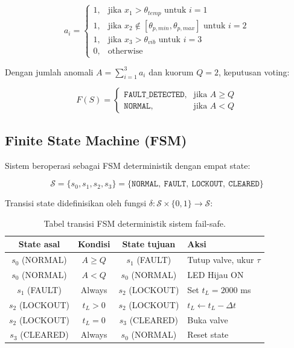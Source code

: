 \documentclass[12pt,a4paper]{article}
\begin{document}
\begin{equation}
  a_i = \begin{cases}
    1, & \text{jika } x_1 > \theta_{temp} \text{ untuk } i = 1 \\
    1, & \text{jika } x_2 \notin [\theta_{p,min}, \theta_{p,max}] \text{ untuk } i = 2 \\
    1, & \text{jika } x_3 > \theta_{vib} \text{ untuk } i = 3 \\
    0, & \text{otherwise}
  \end{cases}
\end{equation}

Dengan jumlah anomali $A = \sum_{i=1}^{3} a_i$ dan kuorum $Q = 2$, keputusan voting:

\begin{equation}
  F(S) = \begin{cases}
    \texttt{FAULT\_DETECTED}, & \text{jika } A \geq Q \\
    \texttt{NORMAL}, & \text{jika } A < Q
  \end{cases}
\end{equation}

\subsection{Finite State Machine (FSM)}

Sistem beroperasi sebagai FSM deterministik dengan empat state:

\begin{equation}
  \mathcal{S} = \{s_0, s_1, s_2, s_3\} = \{\texttt{NORMAL},\ \texttt{FAULT},\ \texttt{LOCKOUT},\ \texttt{CLEARED}\}
\end{equation}

Transisi state didefinisikan oleh fungsi $\delta: \mathcal{S} \times \{0, 1\} \rightarrow \mathcal{S}$:

\begin{table}[H]
  \centering
  \begin{tabular}{|c|c|c|l|}
    \hline
    \textbf{State asal} & \textbf{Kondisi} & \textbf{State tujuan} & \textbf{Aksi} \\
    \hline
    $s_0$ (NORMAL)  & $A \geq Q$ & $s_1$ (FAULT)   & Tutup valve, ukur $\tau$ \\
    $s_0$ (NORMAL)  & $A < Q$    & $s_0$ (NORMAL)  & LED Hijau ON \\
    $s_1$ (FAULT)   & Always     & $s_2$ (LOCKOUT) & Set $t_L = 2000$ ms \\
    $s_2$ (LOCKOUT) & $t_L > 0$  & $s_2$ (LOCKOUT) & $t_L \leftarrow t_L - \Delta t$ \\
    $s_2$ (LOCKOUT) & $t_L = 0$  & $s_3$ (CLEARED) & Buka valve \\
    $s_3$ (CLEARED) & Always     & $s_0$ (NORMAL)  & Reset state \\
    \hline
  \end{tabular}
  \caption{Tabel transisi FSM deterministik sistem fail-safe.}
  \label{tab:fsm}
\end{table}
\end{document}

